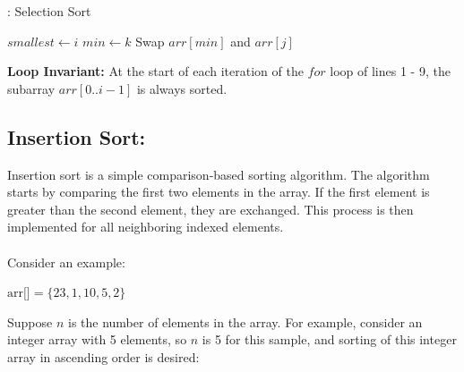 \documentclass[a4paper,12pt,twocolumn]{article}
\begin{document}
\begin{algorithm}[H]
    \caption{: Selection Sort\cite{horowitz1997computer}}
    \begin{algorithmic}[1]
        \State $smallest \gets i$
                \State $min \gets k$
            \EndIf
        \EndFor
        \State Swap $arr[min]$ and $arr[j]$
    \EndFor
    \end{algorithmic}
\end{algorithm}

\textbf{Loop Invariant:}
At the start of each iteration of the $for$ loop of lines 1 - 9, the subarray $arr[0..i-1]$ is always sorted.\cite{geeksforgeeks}


\subsection{Insertion Sort:}

Insertion sort is a simple comparison-based sorting algorithm. The algorithm starts by comparing the first two elements in the array. If the first element is greater than the second element, they are exchanged. This process is then implemented for all neighboring indexed elements.
\\ \\
Consider an example:\\
\begin{center}
    \(\text{arr[]} = \{23, 1, 10, 5, 2\}\)
\end{center}

Suppose \(n\) is the number of elements in the array. For example, consider an integer array with 5 elements, so \(n\) is 5 for this sample, and sorting of this integer array in ascending order is desired:
\\
%
\end{document}
